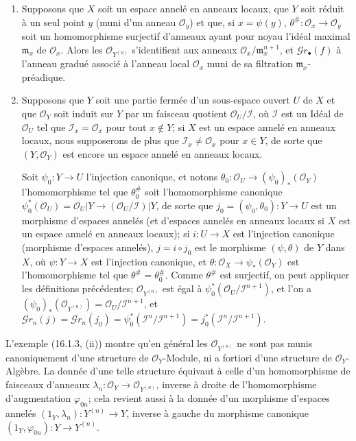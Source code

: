 \begin{examples}[16.1.3]
\label{IV.16.1.3}
\begin{enumerate}
\item[(i)] Supposons que $X$ soit un espace annelé en anneaux locaux, que $Y$ soit
réduit à un seul point $y$ (muni d'un anneau $\mathcal{O}_y$) et que, si
$x=\psi(y)$, $\theta^\#:\mathcal{O}_x\to\mathcal{O}_y$ soit un homomorphisme
surjectif d'anneaux ayant pour noyau l'idéal maximal $\mathfrak{m}_x$ de
$\mathcal{O}_x$. Alors les $\mathcal{O}_{Y^{(n)}}$ s'identifient aux anneaux
$\mathcal{O}_x/\mathfrak{m}_x^{n+1}$, et $\mathscr{G}r_\bullet(f)$ à l'anneau
gradué associé à l'anneau local $\mathcal{O}_x$ muni de sa filtration
$\mathfrak{m}_x$-préadique.
\item[(ii)] Supposons que $Y$ soit une partie fermée d'un sous-espace ouvert $U$
de $X$ et que $\mathcal{O}_Y$ soit induit sur $Y$ par un faisceau quotient
$\mathcal{O}_U/\mathscr{I}$, où $\mathscr{I}$ est un Idéal de $\mathcal{O}_U$
tel que $\mathscr{I}_x=\mathcal{O}_x$ pour tout $x\notin Y$; si $X$ est un
espace annelé en anneaux locaux, nous supposerons de plus que
$\mathscr{I}_x\neq\mathcal{O}_x$ pour $x\in Y$, de sorte que
$(Y,\mathcal{O}_Y)$ est encore un espace annelé en anneaux locaux.

Soit $\psi_0:Y\to U$ l'injection canonique, et notons
$\theta_0:\mathcal{O}_U\to(\psi_0)_*(\mathcal{O}_Y)$ l'homomorphisme tel que
$\theta_0^\#$ soit l'homomorphisme canonique
$\psi_0^*(\mathcal{O}_U)=\mathcal{O}_U|Y\to
(\mathcal{O}_U/\mathscr{I})|Y$, de sorte que
$j_0=(\psi_0,\theta_0):Y\to U$ est un morphisme d'espaces annelés (et d'espaces
annelés en anneaux locaux si $X$ est un espace annelé en anneaux locaux); si
$i:U\to X$ est l'injection canonique (morphisme d'espaces annelés),
$j=i\circ j_0$ est le morphisme $(\psi,\theta)$ de $Y$ dans $X$, où
$\psi:Y\to X$ est l'injection canonique, et
$\theta:\mathcal{O}_X\to\psi_*(\mathcal{O}_Y)$ est l'homomorphisme tel que
$\theta^\#=\theta_0^\#$. Comme $\theta^\#$ est surjectif, on peut appliquer les
définitions précédentes; $\mathcal{O}_{Y^{(n)}}$ est égal à
$\psi_0^*(\mathcal{O}_U/\mathscr{I}^{n+1})$, et l'on a
$(\psi_0)_*(\mathcal{O}_{Y^{(n)}})=\mathcal{O}_U/\mathscr{I}^{n+1}$, et
$\mathscr{G}r_n(j)=\mathscr{G}r_n(j_0)=
\psi_0^*(\mathscr{I}^n/\mathscr{I}^{n+1})=
j_0^*(\mathscr{I}^n/\mathscr{I}^{n+1})$.
\end{enumerate}
\end{examples}

\begin{env}[16.1.4]
\label{IV.16.1.4}
L'exemple (16.1.3, (ii)) montre qu'en général les
$\mathcal{O}_{Y^{(n)}}$ ne sont pas munis canoniquement d'une structure de
$\mathcal{O}_Y$-Module, ni a fortiori d'une structure de
$\mathcal{O}_Y$-Algèbre. La donnée d'une telle structure équivaut à celle d'un
homomorphisme de faisceaux d'anneaux
$\lambda_n:\mathcal{O}_Y\to\mathcal{O}_{Y^{(n)}}$, inverse à droite de
l'homomorphisme d'augmentation $\varphi_{0n}$; cela revient aussi à la donnée
d'un morphisme d'espaces annelés
$(1_Y,\lambda_n):Y^{(n)}\to Y$, inverse à gauche du morphisme canonique
$(1_Y,\varphi_{0n}):Y\to Y^{(n)}$.
\end{env}

